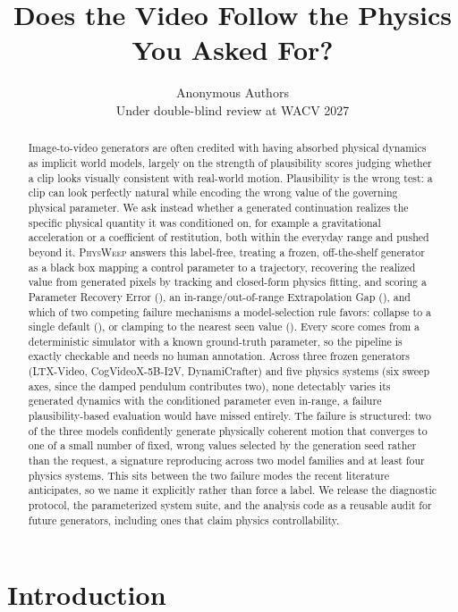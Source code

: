 \documentclass[10pt,twocolumn,letterpaper]{article}
\title{\textbf{Does the Video Follow the Physics You Asked For?}}
\author{Anonymous Authors\\ Under double-blind review at WACV 2027}
\begin{document}
\maketitle
\begin{abstract}
Image-to-video generators are often credited with having absorbed physical
dynamics as implicit world models, largely on the strength of plausibility
scores judging whether a clip looks visually consistent with real-world
motion. Plausibility is the wrong test: a clip can look perfectly natural
while encoding the wrong value of the governing physical parameter. We ask
instead whether a generated continuation realizes the specific physical
quantity it was conditioned on, for example a gravitational acceleration
or a coefficient of restitution, both within the everyday range and pushed
beyond it. \textsc{PhysWeep} answers this label-free, treating a frozen,
off-the-shelf generator as a black box mapping a control parameter to a
trajectory, recovering the realized value from generated pixels by
tracking and closed-form physics fitting, and scoring a Parameter Recovery
Error (\PRE), an in-range/out-of-range Extrapolation Gap (\EG), and which
of two competing failure mechanisms a model-selection rule favors:
collapse to a single default (\PRI), or clamping to the nearest seen value
(\CBI). Every score comes from a deterministic simulator with a known
ground-truth parameter, so the pipeline is exactly checkable and needs no
human annotation. Across three frozen generators (LTX-Video,
CogVideoX-5B-I2V, DynamiCrafter) and five physics systems (six sweep axes,
since the damped pendulum contributes two), none detectably
varies its generated dynamics with the conditioned parameter even
in-range, a failure plausibility-based evaluation would have missed
entirely. The failure is structured: two of the three models confidently
generate physically coherent motion that converges to one of a small
number of fixed, wrong values selected by the generation seed rather than
the request, a signature reproducing across two model families and at
least four physics systems. This sits between the two failure modes the
recent literature anticipates, so we name it explicitly rather than force
a label. We release the diagnostic protocol, the parameterized system
suite, and the analysis code as a reusable audit for future generators,
including ones that claim physics controllability.
\end{abstract}
\section{Introduction}
\end{document}
